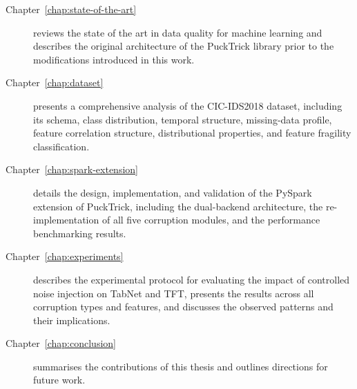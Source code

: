\begin{description}
    \item[Chapter~\ref{chap:state-of-the-art}] reviews the state of the art
        in data quality for machine learning and describes the original
        architecture of the PuckTrick library prior to the modifications
        introduced in this work.
    \item[Chapter~\ref{chap:dataset}] presents a comprehensive analysis of the
        CIC-IDS2018 dataset, including its schema, class distribution,
        temporal structure, missing-data profile, feature correlation structure,
        distributional properties, and feature fragility classification.
    \item[Chapter~\ref{chap:spark-extension}] details the design, implementation,
        and validation of the PySpark extension of PuckTrick, including the
        dual-backend architecture, the re-implementation of all five corruption
        modules, and the performance benchmarking results.
    \item[Chapter~\ref{chap:experiments}] describes the experimental protocol
        for evaluating the impact of controlled noise injection on TabNet and
        TFT, presents the results across all corruption types and features, and
        discusses the observed patterns and their implications.
    \item[Chapter~\ref{chap:conclusion}] summarises the contributions of this
        thesis and outlines directions for future work.
\end{description}
